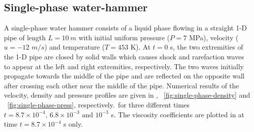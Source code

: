 \documentclass{mc2015}
\begin{document}
\subsection{Single-phase water-hammer} \label{sec:single-num-res}
%
A single-phase water hammer consists of a liquid phase flowing in a straight 1-D pipe of length $L=10 \ m$ with initial uniform pressure ($P = 7$ MPa), velocity ($u = -12$ $m/s$) and temperature ($T = 453$ K). At $t=0$ s, the two extremities of the 1-D pipe are closed by solid walls which causes shock and rarefaction waves to appear at the left and right extremities, respectively. The two waves initially propagate towards the middle of the pipe and are reflected on the opposite wall after crossing each other near the middle of the pipe. Numerical results of the velocity, density and pressure profiles are given in , ~\ref{fig:single-phase-density} and ~\ref{fig:single-phase-press}, respectively.\, for three different times $t=8.7 \times 10^{-4}, \, 6.8 \times 10^{-3} \text{ and } 10^{-3}$ s. The viscosity coefficients are plotted in  at time $t = 8.7 \times 10^{-4}$ s only.
%
\end{document}
